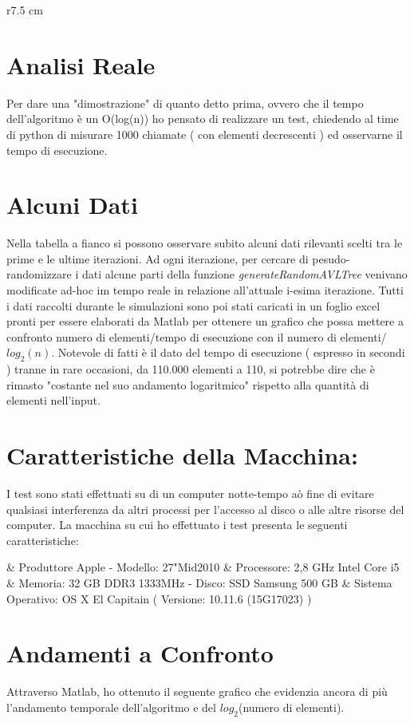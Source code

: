 \begin{wraptable}{r}{7.5 cm}
	\vspace{-10pt}
	\vspace{-10pt}
\end{wraptable} 
\section{Analisi Reale}
Per dare una "dimostrazione" di quanto detto prima, ovvero che il tempo dell'algoritmo è un O(log(n)) ho pensato di realizzare un test, chiedendo al time di python di misurare 1000 chiamate ( con elementi decrescenti ) ed osservarne il tempo di esecuzione.
\section{Alcuni Dati}
Nella tabella a fianco si possono osservare subito alcuni dati rilevanti scelti tra le prime e le ultime iterazioni. Ad ogni iterazione, per cercare di pesudo-randomizzare i dati alcune parti della funzione \emph{generateRandomAVLTree} venivano modificate ad-hoc im tempo reale in relazione all'attuale i-esima iterazione. Tutti i dati raccolti durante le simulazioni  sono poi stati caricati in un foglio excel pronti per essere elaborati da Matlab per ottenere un grafico che possa mettere a confronto numero di elementi/tempo di esecuzione con il numero di elementi/$log_2(n)$. Notevole di fatti è il dato del tempo di esecuzione ( espresso in secondi ) tranne in rare occasioni, da 110.000 elementi a 110, si potrebbe dire che è rimasto "costante nel suo andamento logaritmico" rispetto alla quantità di elementi nell'input.
\section{Caratteristiche della Macchina:}I test sono stati effettuati su di un computer notte-tempo aò fine di evitare qualsiasi interferenza da altri processi per l'accesso al disco o alle altre risorse del computer. La macchina su cui ho effettuato i test presenta le seguenti caratteristiche:
\begin{easylist}[itemize]
		& Produttore Apple -  Modello: 27"Mid2010
		& Processore: 2,8 GHz Intel Core i5
		& Memoria: 32 GB  DDR3  1333MHz - Disco: SSD Samsung 500 GB
		& Sistema Operativo: OS X El Capitain ( Versione: 10.11.6 (15G17023) )
\end{easylist}
\section{Andamenti a Confronto}
Attraverso Matlab, ho ottenuto il seguente grafico che evidenzia ancora di più l'andamento temporale dell'algoritmo e del $log_2$(numero di elementi).


